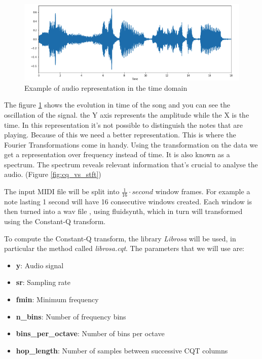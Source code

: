 \begin{figure}[h!]
	\caption[Example of audio representation in the time domain]{ Example of audio representation in the time domain \cite{genre_class} }
	\centering
	\label{fig:waveform}
	\includegraphics[width=1\textwidth, height=\textheight, keepaspectratio]{"resources/waveform"}
\end{figure}

The figure \ref{fig:waveform} shows the evolution in time of the song and you can see the oscillation of the signal. the Y axis represents the amplitude while the X is the time. In this representation it's not possible to distinguish the notes that are playing. Because of this we need a better representation. This is where the Fourier Transformations come in handy. Using the transformation on the data we get a representation over frequency instead of time. It is also known as a spectrum. The spectrum reveals relevant information that's crucial to analyse the audio. (Figure \ref{fig:cq_vs_stft})
\par

The input MIDI file will be split into $\frac{1}{16}\cdot second$ window frames. For example a note lasting 1 second will have 16 consecutive windows created. Each window is then turned into a wav file , using fluidsynth\cite{fluidsynth}, which in turn will transformed using the Constant-Q transform.

\par
To compute the Constant-Q transform, the library \textit{Librosa} \cite{librosa} will be used, in particular the method called \textit{librosa.cqt}.
The parameters that we will use are:
\begin{itemize}
	\item \textbf{y}: Audio signal
	\item \textbf{sr}: Sampling rate
	\item \textbf{fmin}: Minimum frequency
	\item \textbf{n\_bins}: Number of frequency bins
	\item \textbf{bins\_per\_octave}: Number of bins per octave
	\item \textbf{hop\_length}: Number of samples between successive CQT columns
\end{itemize}
\par


